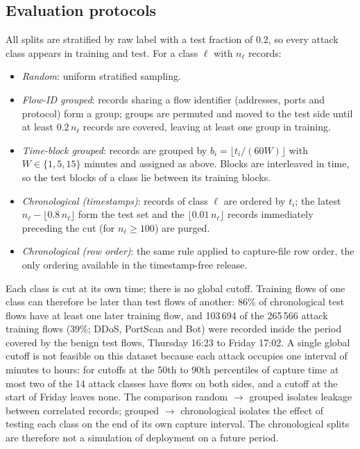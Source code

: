\documentclass[conference]{IEEEtran}
\begin{document}
\subsection{Evaluation protocols}
\label{sec:protocols}
All splits are stratified by raw label with a test fraction of 0.2, so every attack class appears in training and test. For a class $\ell$ with $n_\ell$ records:
\begin{itemize}
\item \emph{Random}: uniform stratified sampling.
\item \emph{Flow-ID grouped}: records sharing a flow identifier (addresses, ports and protocol) form a group; groups are permuted and moved to the test side until at least $0.2\,n_\ell$ records are covered, leaving at least one group in training.
\item \emph{Time-block grouped}: records are grouped by $b_i=\lfloor t_i/(60W)\rfloor$ with $W\in\{1,5,15\}$ minutes and assigned as above. Blocks are interleaved in time, so the test blocks of a class lie between its training blocks.
\item \emph{Chronological (timestamps)}: records of class $\ell$ are ordered by $t_i$; the latest $n_\ell-\lfloor 0.8\,n_\ell\rfloor$ form the test set and the $\lfloor 0.01\,n_\ell\rfloor$ records immediately preceding the cut (for $n_\ell\ge 100$) are purged.
\item \emph{Chronological (row order)}: the same rule applied to capture-file row order, the only ordering available in the timestamp-free release.
\end{itemize}
Each class is cut at its own time; there is no global cutoff. Training flows of one class can therefore be later than test flows of another: 86\% of chronological test flows have at least one later training flow, and 103\,694 of the 265\,566 attack training flows (39\%; DDoS, PortScan and Bot) were recorded inside the period covered by the benign test flows, Thursday 16:23 to Friday 17:02. A single global cutoff is not feasible on this dataset because each attack occupies one interval of minutes to hours: for cutoffs at the 50th to 90th percentiles of capture time at most two of the 14 attack classes have flows on both sides, and a cutoff at the start of Friday leaves none. The comparison random $\rightarrow$ grouped isolates leakage between correlated records; grouped $\rightarrow$ chronological isolates the effect of testing each class on the end of its own capture interval. The chronological splits are therefore not a simulation of deployment on a future period.
\end{document}
